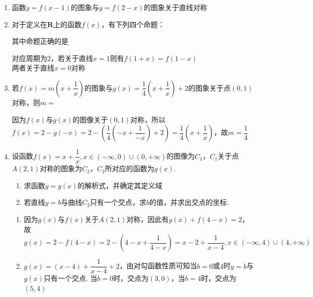 \begin{enumerate}
    \item 函数$y = f(x-1)$的图象与$y = f(2-x)$的图象关于直线对称
    \item 对于定义在$\mathbf{R}$上的函数$f(x)$，有下列四个命题：
    其中命题正确的是
    \begin{jieda}
        对应周期为2，若关于直线$x = 1$则有$f(1+x) = f(1-x)$ \\
        两者关于直线$x = 0$对称
    \end{jieda}
    \item 若$f(x) = m\left(x+\dfrac{1}{x}\right)$的图象与$g(x) = \dfrac{1}{4}\left(x+\dfrac{1}{x}\right)+2$的图象关于点$(0, 1)$对称，则$m = $
    \begin{jieda}
        因为$f(x)$与$g(x)$的图像关于$(0, 1)$对称，所以$f(x) = 2-g(-x) = 2-\left(\dfrac{1}{4}\left(-x+\dfrac{1}{-x}\right)+2\right) = \dfrac{1}{4}\left(x+\dfrac{1}{x}\right)$，故$m = \dfrac{1}{4}$
    \end{jieda}
    \item 设函数$f(x) = x + \dfrac{1}{x}, x \in (-\infty, 0) \cup (0, +\infty)$的图像为$C_1$，$C_1$关于点$A(2, 1)$对称的图象为$C_2$，$C_2$所对应的函数为$g(x)$.
    \begin{enumerate}
        \item 求函数$y = g(x)$的解析式，并确定其定义域
        \item 若直线$y = b$与曲线$C_2$只有一个交点，求$b$的值，并求出交点的坐标.
    \end{enumerate}
    \begin{jieda}
        \begin{enumerate}
            \item 因为$g(x)$与$f(x)$关于$A(2, 1)$对称，因此有$g(x) + f(4-x) = 2$，故$g(x) = 2-f(4-x) = 2-\left(4-x + \dfrac{1}{4-x}\right) = x-2+\dfrac{1}{x-4}, x \in (-\infty, 4) \cup (4, +\infty)$
            \item $g(x) = (x-4) + \dfrac{1}{x-4} + 2$，由对勾函数性质可知当$b = 0$或$4$时$y = b$与$g(x)$只有一个交点. 当$b = 0$时，交点为$(3, 0)$，当$b = 4$时，交点为$(5, 4)$
        \end{enumerate}
    \end{jieda}
\end{enumerate}
